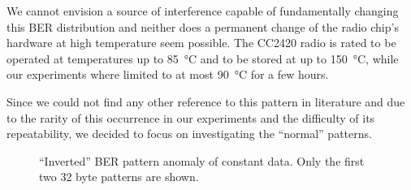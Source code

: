 We cannot envision a source of interference capable of fundamentally changing this \ac{BER} distribution and neither does a permanent change of the radio chip's hardware at high temperature seem possible.
The CC2420 radio is rated to be operated at temperatures up to \SI{85}{\celsius} and to be stored at up to \SI{150}{\celsius}, while our experiments where limited to at most \SI{90}{\celsius} for a few hours.

Since we could not find any other reference to this pattern in literature and due to the rarity of this occurrence in our experiments and the difficulty of its repeatability, we decided to focus on investigating the ``normal'' patterns.

\begin{figure}[t]
	\caption{``Inverted'' \acs{BER} pattern anomaly of constant data. Only the first two 32 byte patterns are shown.}
	\label{fig:anomalie_bit_error}
\end{figure}


